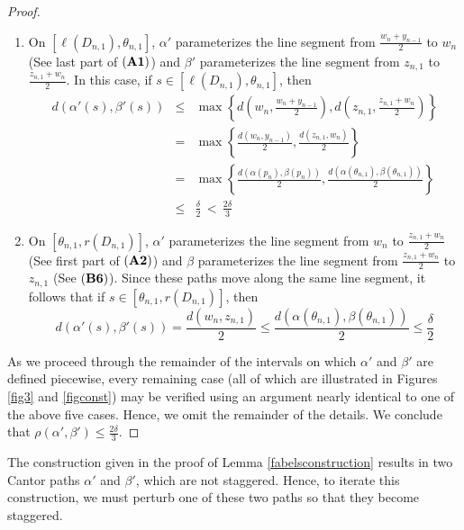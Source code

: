 \documentclass[12pt, leqno]{amsart}
\theoremstyle{definition}\newtheorem{definition}[theorem]{Definition}
\begin{document}
\begin{proof}
\begin{enumerate}
    \item On $[\ell(D_{n,1}),\theta_{n,1}]$, $\alpha '$ parameterizes the line segment from $\frac{w_n+y_{n-1}}{2}$ to $w_n$  (See last part of $\bf (A1)$) and $\beta '$ parameterizes the line segment from $z_{n,1}$ to $\frac{z_{n,1}+w_n}{2}$. In this case, if $s\in [\ell(D_{n,1}),\theta_{n,1}]$, then
    \begin{eqnarray*}
    d(\alpha '(s),\beta '(s)) &\leq&  \max\left\{ d\left(w_n,\frac{w_n+y_{n-1}}{2}\right),d\left(z_{n,1},\frac{z_{n,1}+w_n}{2}\right)\right\}\\
    &=& \max\left\{\frac{ d(w_n,y_{n-1})}{2},\frac{d(z_{n,1},w_n)}{2}\right\}\\
    &=& \max\left\{\frac{ d(\alpha(p_n),\beta(p_n))}{2},\frac{d(\alpha(\theta_{n,1}),\beta(\theta_{n,1}))}{2}\right\}\\
    & \leq & \frac{\delta}{2} \,<\, \frac{2\delta}{3}
    \end{eqnarray*}

    \item On $[\theta_{n,1},r(D_{n,1})]$, $\alpha '$ parameterizes the line segment from $w_n$ to $\frac{z_{n,1}+w_n}{2}$  (See first part of $\bf (A2)$) and $\beta$ parameterizes the line segment from $\frac{z_{n,1}+w_n}{2}$ to $z_{n,1}$  (See $\bf (B6)$). Since these paths move along the same line segment, it follows that if $s\in [\theta_{n,1},r(D_{n,1})]$, then \[d(\alpha '(s),\beta '(s))=\frac{d(w_n,z_{n,1})}{2}\leq \frac{d(\alpha(\theta_{n,1}),\beta(\theta_{n,1}))}{2}\leq \frac{\delta}{2}\]
\end{enumerate}

As we proceed through the remainder of the intervals on which $\alpha '$ and $\beta '$ are defined piecewise, every remaining case (all of which are illustrated in Figures \ref{fig3} and \ref{figconst}) may be verified using an argument nearly identical to one of the above five cases. Hence, we omit the remainder of the details. We conclude that $\rho(\alpha',\beta')\leq \frac{2\delta}{3}$.
\end{proof}




The construction given in the proof of Lemma \ref{fabelsconstruction} results in two Cantor paths $\alpha '$ and $\beta '$, which are not staggered. Hence, to iterate this construction, we must perturb one of these two paths so that they become staggered.
\end{document}
